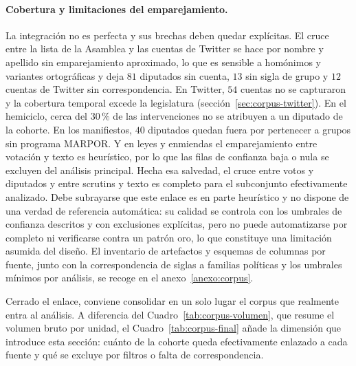 \paragraph{Cobertura y limitaciones del emparejamiento.}
La integración no es perfecta y sus brechas deben quedar explícitas. El cruce
entre la lista de la Asamblea y las cuentas de Twitter se hace por nombre y
apellido sin emparejamiento aproximado, lo que es sensible a homónimos y variantes
ortográficas y deja $81$ diputados sin cuenta, $13$ sin sigla de grupo y $12$
cuentas de Twitter sin correspondencia. En Twitter, $54$ cuentas no se capturaron
y la cobertura temporal excede la legislatura
(sección~\ref{sec:corpus-twitter}). En el hemiciclo, cerca del $30\,\%$ de las
intervenciones no se atribuyen a un diputado de la cohorte. En los manifiestos,
$40$ diputados quedan fuera por pertenecer a grupos sin programa MARPOR. Y en
leyes y enmiendas el emparejamiento entre votación y texto es heurístico, por lo
que las filas de confianza baja o nula se excluyen del análisis principal. Hecha
esa salvedad, el cruce entre votos y diputados y entre scrutins y texto es
completo para el subconjunto efectivamente analizado. Debe subrayarse que este
enlace es en parte heurístico y no dispone de una verdad de referencia automática:
su calidad se controla con los umbrales de confianza descritos y con exclusiones
explícitas, pero no puede automatizarse por completo ni verificarse contra un
patrón oro, lo que constituye una limitación asumida del diseño. El inventario de artefactos
y esquemas de columnas por fuente, junto con la correspondencia de siglas a
familias políticas y los umbrales mínimos por análisis, se recoge en el
anexo~\ref{anexo:corpus}.

Cerrado el enlace, conviene consolidar en un solo lugar el corpus que realmente
entra al análisis. A diferencia del Cuadro~\ref{tab:corpus-volumen}, que resume el
volumen bruto por unidad, el Cuadro~\ref{tab:corpus-final} añade la dimensión que
introduce esta sección: cuánto de la cohorte queda efectivamente enlazado a cada
fuente y qué se excluye por filtros o falta de correspondencia.

